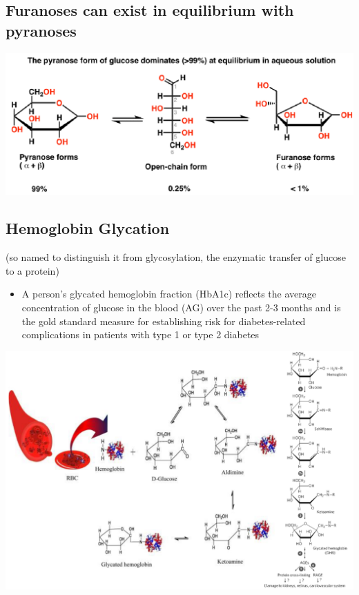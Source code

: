 \documentclass[10pt]{article}
\begin{document}
\subsection*{Furanoses can exist in equilibrium with pyranoses}
\begin{center}
    \includegraphics*[width=\textwidth]{L1_11.png}
\end{center}

\subsection*{Hemoglobin Glycation}
(so named to distinguish it from glycosylation, the enzymatic transfer of glucose to a protein)

\begin{itemize}
    \item A person's glycated hemoglobin fraction (HbA1c) reflects the average concentration of glucose in the blood (AG) over the past 2-3 months and is the gold standard measure for establishing risk for diabetes-related complications in patients with type 1 or type 2 diabetes
\end{itemize}
\begin{center}
    \includegraphics*[width=\textwidth]{L1_12.png}
\end{center}
\end{document}

